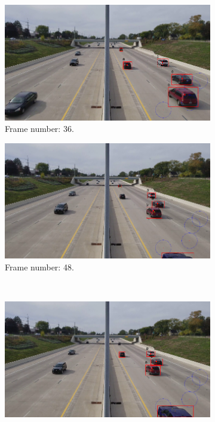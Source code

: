 \begin{figure}[H]
    \centering
    \begin{subfigure}{0.48\textwidth}
        \centering
        \includegraphics[width=\linewidth]{../../../experiments/E1/V1/noPd/36}
        \caption{Frame number: 36.}
        \label{fig:E1-V1-S0:01}
    \end{subfigure}
    \begin{subfigure}{0.48\textwidth}
        \centering
        \includegraphics[width=\linewidth]{../../../experiments/E1/V1/noPd/48}
        \caption{Frame number: 48.}
        \label{fig:E1-V1-S0:02}
    \end{subfigure}
    \\
    \begin{subfigure}{0.48\textwidth}
        \centering
        \includegraphics[width=\linewidth]{../../../experiments/E1/V1/noPd/49}

\end{subfigure}
\end{figure}
